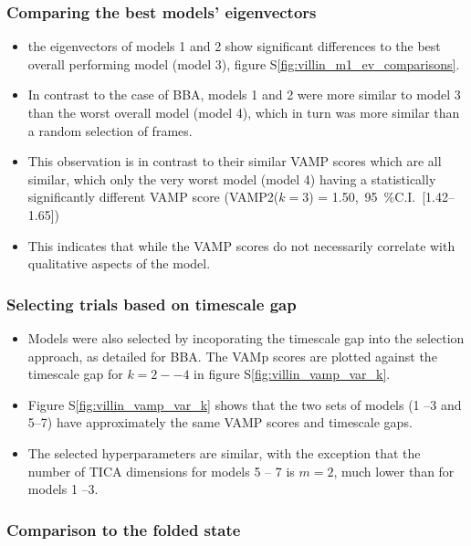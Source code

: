 \documentclass[journal=jacsat,manuscript=article]{achemso}
\newcommand{\numci}[3]{\num{#1},\ \SI{95}{\percent}C.I.\ [\numrange[range-phrase=---]{#2}{#3}]}
\newcommand*\sref[1]{%
    S\ref{#1}}
\begin{document}
\subsubsection{Comparing the best models' eigenvectors}
\begin{itemize}
    \item the eigenvectors of models 1 and 2 show significant differences to the best overall performing model (model 3), figure \sref{fig:villin_m1_ev_comparisons}.  
    \item In contrast to the case of BBA, models 1 and 2 were more similar to model 3 than the worst overall model (model 4), which in turn was more similar than a random selection of frames.  
    \item This observation is in contrast to their similar VAMP scores which are all similar, which only the very worst model (model 4) having a statistically significantly different VAMP score (VAMP2($k=3$) = \numci{1.50}{1.42}{1.65})
    \item This indicates that while the VAMP scores do not necessarily correlate with qualitative aspects of the model.  
\end{itemize} 

\subsubsection{Selecting trials based on timescale gap}
\begin{itemize}
    \item Models were also selected by incoporating the timescale gap into the selection approach, as detailed for BBA. The VAMp scores are plotted against the timescale gap for $k=2 -- 4$ in figure \sref{fig:villin_vamp_var_k}.  
    \item Figure \sref{fig:villin_vamp_var_k} shows that the two sets of models (1 --3 and 5--7) have approximately the same VAMP scores and timescale gaps. 
    \item The selected hyperparameters are similar, with the exception that the number of TICA dimensions for models 5 -- 7 is $m=2$,  much lower than for models 1 --3.  
\end{itemize}

\subsubsection{Comparison to the folded state}
\end{document}
